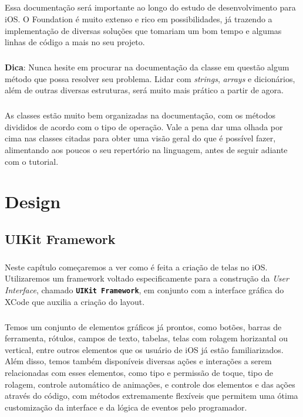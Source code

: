 \documentclass[a4paper,12pt,brazil,doubleside]{book}
\begin{document}
\begin{singlespace}
\paragraph{}Essa documentação será importante ao longo do estudo de desenvolvimento para iOS. O Foundation é muito extenso e rico em possibilidades, já trazendo a implementação de diversas soluções que tomariam um bom tempo e algumas linhas de código a mais no seu projeto.

\begin{framed}
\paragraph{}\textbf{Dica}: Nunca hesite em procurar na documentação da classe em questão algum método que possa resolver seu problema. Lidar com \textit{strings}, \textit{arrays} e dicionários, além de outras diversas estruturas, será muito mais prático a partir de agora.
\end{framed}

\paragraph{}As classes estão muito bem organizadas na documentação, com os métodos divididos de acordo com o tipo de operação. Vale a pena dar uma olhada por cima nas classes citadas para obter uma visão geral do que é possível fazer, alimentando aos poucos o seu repertório na linguagem, antes de seguir adiante com o tutorial.


\chapter{Design}

\section{UIKit Framework}

\paragraph{}Neste capítulo começaremos a ver como é feita a criação de telas no iOS. Utilizaremos um framework voltado especificamente para a construção da \emph{User Interface}, chamado \texttt{\textbf{UIKit Framework}}, em conjunto com a interface gráfica do XCode que auxilia a criação do layout.
\paragraph{}Temos um conjunto de elementos gráficos já prontos, como botões, barras de ferramenta, rótulos, campos de texto, tabelas, telas com rolagem horizantal ou vertical, entre outros elementos que os usuário de iOS já estão familiarizados. Além disso, temos também disponíveis diversas ações e interações a serem relacionadas com esses elementos, como tipo e permissão de toque, tipo de rolagem, controle automático de animações, e controle dos elementos e das ações através do código, com métodos extremamente flexíveis que permitem uma ótima customização da interface e da lógica de eventos pelo programador.


\end{singlespace}
\end{document}
